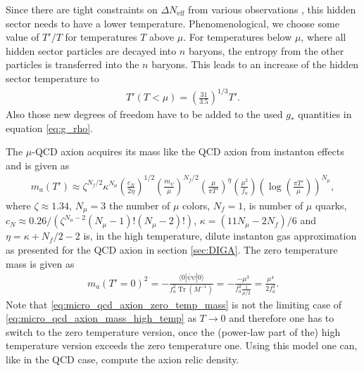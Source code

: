 \documentclass[twoside,a4paper, 12pt]{article}
\DeclareMathOperator{\trace}{Tr}
\numberwithin{equation}{section}
\begin{document}
\noindent
Since there are tight constraints on $\Delta N_\mathrm{eff}$ from various observations \cite{PDG} \cite{Planck},
this hidden sector needs to have a lower temperature. 
Phenomenological, we choose some value of $T' / T$ for temperatures $T$ above $\mu$.
For temperatures below $\mu$, where all hidden sector particles are decayed into $n$ baryons,
the entropy from the other particles is transferred into the $n$ baryons.
This leads to an increase of the hidden sector temperature to
\begin{align}
    \label{eq:micro_qcd_temperature2}
    T'(T < \mu) = \left(\frac{31}{3.5}\right)^{1/3} T'.
\end{align}
Also those new degrees of freedom have to be added to the used $g_*$ quantities in equation \eqref{eq:g_rho}.

\noindent
The $\mu$-QCD axion acquires its mass like the QCD axion from instanton effects and is given as \cite[Eq. 3]{microqcd}
\begin{align}
    \label{eq:micro_qcd_axion_mass_high_temp}
    m_a(T') \approx \zeta^{N_f / 2} \kappa^{N_\mu} \left( \frac{c_N}{2 \eta} \right)^{1/2} \left(\frac{m_\psi}{\mu} \right)^{N_f / 2} \left( \frac{\mu}{\pi T'} \right)^\eta \left( \frac{\mu^2}{f_a} \right) \left( \log \left( \frac{\pi T'}{\mu} \right) \right)^{N_\mu} ,
\end{align}
where $\zeta \approx 1.34$, $N_\mu = 3$ the number of $\mu$ colors, $N_f = 1$, is number of $\mu$ quarks,
$c_N \approx 0.26 / (\zeta^{N_\mu - 2}(N_\mu - 1)!(N_\mu - 2)!)$, $\kappa = (11N_\mu - 2N_f) / 6$ and
$\eta = \kappa + N_f / 2 - 2$ is,
in the high temperature, dilute instanton gas approximation as presented for the QCD axion in section \ref{sec:DIGA}.
The zero temperature mass is given as \cite[Eq. 4]{microqcd}
\begin{align}
    \label{eq:micro_qcd_axion_zero_temp_mass}
    m_a(T' = 0)^2 = - \frac{\langle 0 | \bar{\psi} \psi | 0 \rangle}{f_a^2 \trace (M^{-1})}
    = - \frac{ - \mu^3 }{f_a^2 \frac{1}{\mu / 2}} = \frac{\mu^4}{2 f_a^2}.
\end{align}
Note that \eqref{eq:micro_qcd_axion_zero_temp_mass} is not the limiting case of \eqref{eq:micro_qcd_axion_mass_high_temp}
as $T \rightarrow 0$ and therefore one has to switch to the zero temperature version, once the (power-law part of the) high temperature version
exceeds the zero temperature one.
Using this model one can, like in the QCD case, compute the axion relic density.
\end{document}
